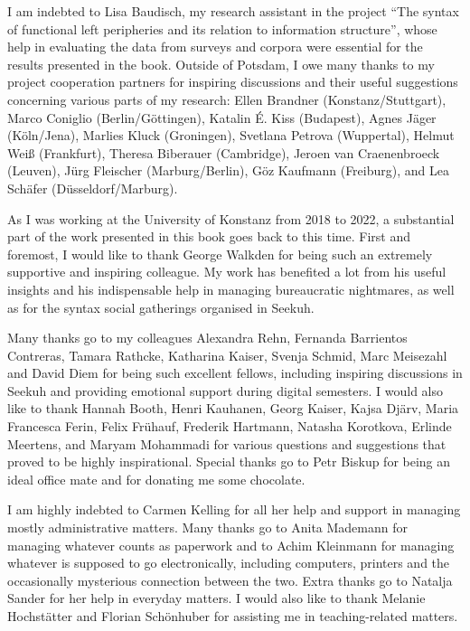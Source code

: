 \begin{sloppypar}
I am indebted to Lisa Baudisch, my research assistant in the project ``The syntax of functional left peripheries and its relation to information structure'', whose help in evaluating the data from surveys and corpora were essential for the results presented in the book. Outside of Potsdam, I owe many thanks to my project cooperation partners for inspiring discussions and their useful suggestions concerning various parts of my research: Ellen Brandner (Konstanz\slash Stuttgart), Marco Coniglio (Berlin\slash Göttingen), Katalin É. Kiss (Budapest), Agnes Jäger (Köln\slash Jena), Marlies Kluck (Groningen), Svetlana Petrova (Wuppertal), Helmut Weiß (Frankfurt), Theresa Biberauer (Cambridge), Jeroen van Craenenbroeck (Leuven), Jürg Fleischer (Marburg\slash Berlin), Göz Kaufmann (Freiburg), and Lea Schäfer (Düsseldorf/Marburg).
\end{sloppypar}

As I was working at the University of Konstanz from 2018 to 2022, a substantial part of the work presented in this book goes back to this time. First and foremost, I would like to thank George Walkden for being such an extremely supportive and inspiring colleague. My work has benefited a lot from his useful insights and his indispensable help in managing bureaucratic nightmares, as well as for the syntax social gatherings organised in Seekuh.

Many thanks go to my colleagues Alexandra Rehn, Fernanda Barrientos Contreras, Tamara Rathcke, Katharina Kaiser, Svenja Schmid, Marc Meisezahl and David Diem for being such excellent fellows, including inspiring discussions in Seekuh and providing emotional support during digital semesters. I would also like to thank Hannah Booth, Henri Kauhanen, Georg Kaiser, Kajsa Djärv, Maria Francesca Ferin, Felix Frühauf, Frederik Hartmann, Natasha Korotkova, Erlinde Meertens, and Maryam Mohammadi for various questions and suggestions that proved to be highly inspirational. Special thanks go to Petr Biskup for being an ideal office mate and for donating me some chocolate.

I am highly indebted to Carmen Kelling for all her help and support in managing mostly administrative matters. Many thanks go to Anita Mademann for managing whatever counts as paperwork and to Achim Kleinmann for managing whatever is supposed to go electronically, including computers, printers and the occasionally mysterious connection between the two. Extra thanks go to Natalja Sander for her help in everyday matters. I would also like to thank Melanie Hochstätter and Florian Schönhuber for assisting me in teaching-related matters.

